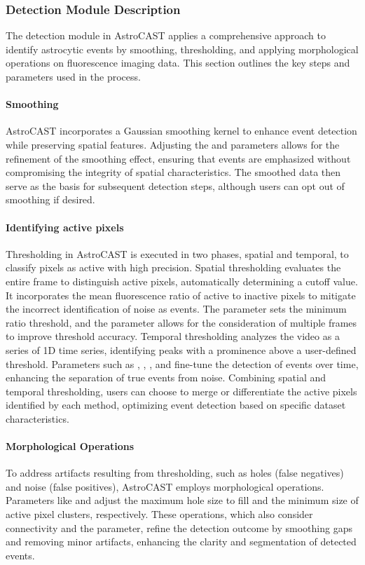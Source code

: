 \subsubsection{Detection Module Description}
The detection module in AstroCAST applies a comprehensive approach to identify astrocytic events by smoothing,
thresholding, and applying morphological operations on fluorescence imaging data. This section outlines the key steps
and parameters used in the process.

\paragraph{Smoothing}
AstroCAST incorporates a Gaussian smoothing kernel to enhance event detection while preserving spatial features.
Adjusting the  and  parameters allows for
the refinement of the smoothing effect, ensuring that events are emphasized without compromising the integrity of
spatial characteristics. The smoothed data then serve as the basis for subsequent detection steps, although users can
opt out of smoothing if desired.

\paragraph{Identifying active pixels}
Thresholding in AstroCAST is executed in two phases, spatial and temporal, to classify pixels as active with high precision. 
Spatial thresholding evaluates the entire frame to distinguish active pixels, automatically determining a cutoff value. It incorporates the mean fluorescence ratio of active to inactive pixels to mitigate the incorrect identification of noise as events. The  parameter sets the minimum ratio threshold, and the  parameter allows for the consideration of multiple frames to improve threshold accuracy.
Temporal thresholding analyzes the video as a series of 1D time series, identifying peaks with a prominence above a user-defined threshold. Parameters such as , , , and  fine-tune the detection of events over time, enhancing the separation of true events from noise.
Combining spatial and temporal thresholding, users can choose to merge or differentiate the active pixels identified by each method, optimizing event detection based on specific dataset characteristics.

\paragraph{Morphological Operations}
To address artifacts resulting from thresholding, such as holes (false negatives) and noise (false positives), AstroCAST employs morphological operations. Parameters like  and  adjust the maximum hole size to fill and the minimum size of active pixel clusters, respectively. These operations, which also consider connectivity and the  parameter, refine the detection outcome by smoothing gaps and removing minor artifacts, enhancing the clarity and segmentation of detected events.

